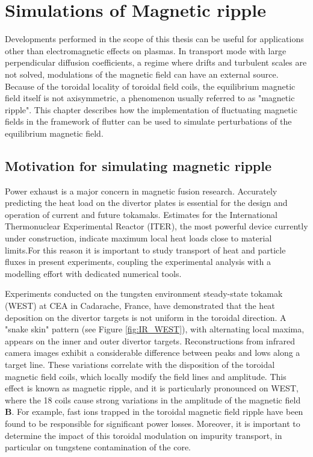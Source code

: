 \chapter{Simulations of Magnetic ripple}
\label{chap:RippleMagnetic}

Developments performed in the scope of this thesis can be useful for applications other than electromagnetic effects on plasmas. In transport mode with large perpendicular diffusion coefficients, a regime where drifts and turbulent scales are not solved, modulations of the magnetic field can have an external source. Because of the toroidal locality of toroidal field coils, the equilibrium magnetic field itself is not axisymmetric, a phenomenon usually referred to as "magnetic ripple". This chapter describes how the implementation of fluctuating magnetic fields in the framework of flutter can be used to simulate perturbations of the equilibrium magnetic field.

\section{Motivation for simulating magnetic ripple}\label{sec:ripple_intro}

Power exhaust is a major concern in magnetic fusion research. Accurately predicting the heat load on the divertor plates is essential for the design and operation of current and future tokamaks. Estimates for the International Thermonuclear Experimental Reactor (ITER), the most powerful device currently under construction, indicate maximum local heat loads close to material limits\cite{gunn2017surface}.For this reason it is important to study transport of heat and particle fluxes in present experiments, coupling the experimental analysis with a modelling effort  with dedicated numerical tools. \newline

Experiments conducted on the tungsten environment steady-state tokamak (WEST) at CEA in Cadarache, France\cite{bucalossi2022}, have demonstrated that the heat deposition on the divertor targets is not uniform in the toroidal direction. A "snake skin" pattern (see Figure \ref{fig:IR_WEST}), with alternating local maxima, appears on the inner and outer divertor targets. Reconstructions from infrared camera images exhibit a considerable difference between peaks and lows along a target line. These variations correlate with the disposition of the toroidal magnetic field coils, which locally modify the field lines and amplitude. This effect is known as magnetic ripple\cite{tani1981effect}, and it is particularly pronounced on WEST, where the 18 coils cause strong variations in the amplitude of the magnetic field $\textbf{B}$. For example, fast ions trapped in the toroidal magnetic field ripple have been found to be responsible for significant power losses\cite{moiraf2023optimization}. Moreover, it is important to determine the impact of this toroidal modulation on impurity transport, in particular on tungstene contamination of the core\cite{diGenova2021modelling}. \newline

